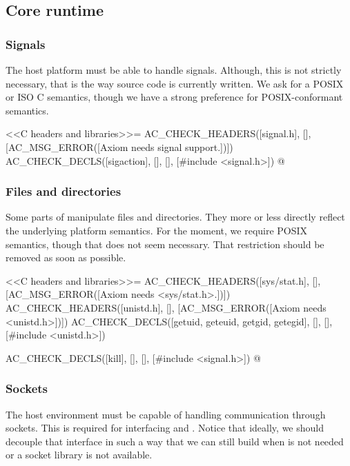 \documentclass[12pt]{article}
\begin{document}
\subsection{Core runtime}

\subsubsection{Signals}

The host platform must be able to handle signals.  Although, this is
not strictly necessary, that is the way  source code
is currently written.  We ask for a POSIX or ISO C semantics, though
we have a strong preference for POSIX-conformant semantics.

<<C headers and libraries>>=
AC_CHECK_HEADERS([signal.h],
                 [],
                 [AC_MSG_ERROR([Axiom needs signal support.])])
AC_CHECK_DECLS([sigaction], [], [],
               [#include <signal.h>])
@


\subsubsection{Files and directories}

Some parts of  manipulate files and directories.  They
more or less directly reflect the underlying platform semantics.
For the moment, we require POSIX semantics, though that does not
seem necessary.  That restriction should be removed as soon as possible.

<<C headers and libraries>>=
AC_CHECK_HEADERS([sys/stat.h],
                 [],
		 [AC_MSG_ERROR([Axiom needs <sys/stat.h>.])])
AC_CHECK_HEADERS([unistd.h], [],
                 [AC_MSG_ERROR([Axiom needs <unistd.h>])])
AC_CHECK_DECLS([getuid, geteuid, getgid, getegid], [], [],
               [#include <unistd.h>])

AC_CHECK_DECLS([kill], [], [],
               [#include <signal.h>])
@

\subsubsection{Sockets}

The host environment must be capable of handling communication through
sockets.  This is required for interfacing 
and .  Notice that ideally, we should decouple
that interface in such a way that we can still build 
when  is not needed or a socket library is not
available.
\end{document}
